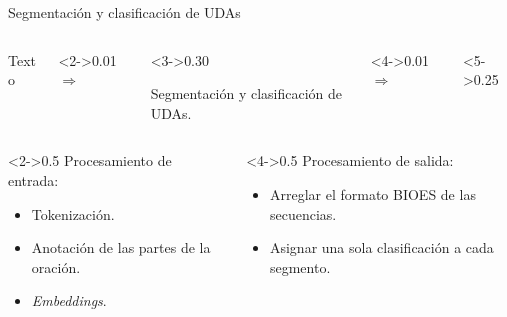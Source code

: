 \documentclass{beamer}
\begin{document}
\begin{frame}{Segmentación y clasificación de UDAs}
    \begin{columns}
        \begin{column}{0.10\textwidth}
            \begin{block}{}
                Texto
            \end{block}
        \end{column}
        \begin{column}<2->{0.01\textwidth}
            \begin{math}
                \Rightarrow
            \end{math}
        \end{column}
        \begin{column}<3->{0.30\textwidth}
            \begin{block}{}
                Segmentación y clasificación de UDAs.
            \end{block}
        \end{column}
        \begin{column}<4->{0.01\textwidth}
            \begin{math}
                \Rightarrow
            \end{math}
        \end{column}
        \begin{column}<5->{0.25\textwidth}
            
        \end{column}
    \end{columns}

    \vspace{1cm}

    \begin{columns}[T]
        \begin{column}<2->{0.5\textwidth}
            Procesamiento de entrada:
            \begin{itemize}
                \item Tokenización.
                \item Anotación de las partes de la oración.
                \item \textit{Embeddings}.
            \end{itemize}
        \end{column}
        \begin{column}<4->{0.5\textwidth}
            Procesamiento de salida:
            \begin{itemize}
                \item Arreglar el formato BIOES de las secuencias.
                \item Asignar una sola clasificación a cada segmento.
            \end{itemize}
        \end{column}
    \end{columns}
\end{frame}
\end{document}
